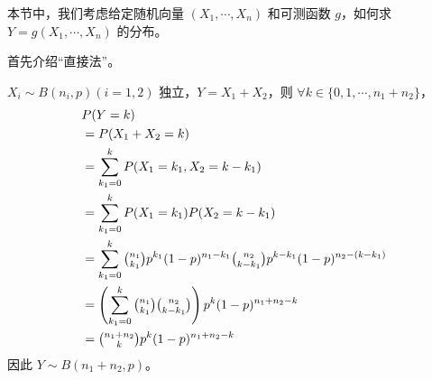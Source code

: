 \documentclass[../main.tex]{subfiles}
\begin{document}
本节中，我们考虑给定随机向量 $(X_1,\cdots,X_n)$ 和可测函数 $g$，如何求 $Y=g(X_1,\cdots,X_n)$ 的分布。

首先介绍“直接法”。

\begin{example}
$X_i\sim B(n_i,p)(i=1,2)$ 独立，$Y=X_1+X_2$，则 $\forall k\in\{0,1,\cdots,n_1+n_2\}$，
    \begin{equation}
    \begin{aligned}
    &P(Y=k)\nonumber\\
    &=P(X_1+X_2=k)\nonumber\\
    &=\sum_{k_1=0}^kP(X_1=k_1,X_2=k-k_1)\nonumber\\
    &=\sum_{k_1=0}^kP(X_1=k_1)P(X_2=k-k_1)\nonumber\\
    &=\sum_{k_1=0}^k\tbinom{n_1}{k_1}p^{k_1}(1-p)^{n_1-k_1}\tbinom{n_2}{k-k_1}p^{k-k_1}(1-p)^{n_2-(k-k_1)}\nonumber\\
    &=\left(\sum_{k_1=0}^k\tbinom{n_1}{k_1}\tbinom{n_2}{k-k_1}\right)p^k(1-p)^{n_1+n_2-k}\nonumber\\
    &=\tbinom{n_1+n_2}{k}p^k(1-p)^{n_1+n_2-k}
    \end{aligned}
    \end{equation}
因此 $Y\sim B(n_1+n_2,p)$。
\end{example}
\end{document}
